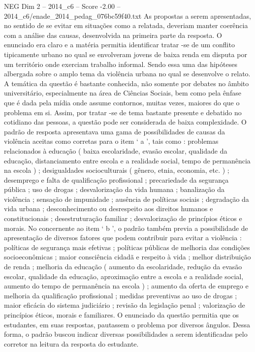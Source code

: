 \begin{textsample}{NEG Dim 2 – 2014\_c6 – Score -2.00 – 2014\_c6/enade\_2014\_pedag\_076bc59f40.txt}
As propostas a serem apresentadas, no sentido de se evitar em situações como a relatada, deveriam manter coerência com a análise das causas, desenvolvida na primeira parte da resposta.
O enunciado era claro e a matéria permitia identificar tratar -se de um conflito tipicamente urbano no qual se envolveram jovens de baixa renda em disputa por um território onde exerciam trabalho informal.
Sendo essa uma das hipóteses albergada sobre o amplo tema da violência urbana no qual se desenvolve o relato.
A temática da questão é bastante conhecida, não somente por debates no âmbito universitário, especialmente na área de Ciências Sociais, bem como pela ênfase que é dada pela mídia onde assume contornos, muitas vezes, maiores do que o problema em si.
Assim, por tratar -se de tema bastante presente e debatido no cotidiano das pessoas, a questão pode ser considerada de baixa complexidade.
O padrão de resposta apresentava uma gama de possibilidades de causas da violência aceitas como corretas para o item ‘ a ’, tais como : problemas relacionados à educação ( baixa escolaridade, evasão escolar, qualidade da educação, distanciamento entre escola e a realidade social, tempo de permanência na escola ) ; desigualdades socioculturais ( gênero, etnia, economia, etc. ) ; desemprego e falta de qualificação profissional ; precariedade da segurança pública ; uso de drogas ; desvalorização da vida humana ; banalização da violência ; sensação de impunidade ; ausência de políticas sociais ; degradação da vida urbana ; desconhecimento ou desrespeito aos direitos humanos e constitucionais ; desestruturação familiar ; desvalorização de princípios éticos e morais.
No concernente ao item ‘ b ’, o padrão também previa a possibilidade de apresentação de diversos fatores que podem contribuir para evitar a violência : políticas de segurança mais efetivas ; políticas públicas de melhoria das condições socioeconômicas ; maior consciência cidadã e respeito à vida ; melhor distribuição de renda ; melhoria da educação ( aumento da escolaridade, redução da evasão escolar, qualidade da educação, aproximação entre a escola e a realidade social, aumento do tempo de permanência na escola ) ; aumento da oferta de emprego e melhoria da qualificação profissional ; medidas preventivas ao uso de drogas ; maior eficácia do sistema judiciário ; revisão da legislação penal ; valorização de princípios éticos, morais e familiares.
O enunciado da questão permitia que os estudantes, em suas respostas, pautassem o problema por diversos ângulos.
Dessa forma, o padrão buscou indicar diversas possibilidades a serem identificadas pelo corretor na leitura da resposta do estudante.

\end{textsample}
